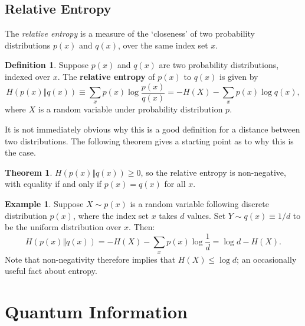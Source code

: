 \documentclass[12pt,a4paper]{report}
\numberwithin{equation}{section}
\theoremstyle{definition}
\newtheorem{definition}{Definition}[section]
\theoremstyle{theorem}
\newtheorem{theorem}{Theorem}[section]
\theoremstyle{theorem}
\theoremstyle{example}
\newtheorem{example}{Example}[section]
\theoremstyle{definition}
\begin{document}
\subsection{Relative Entropy}
The \textit{relative entropy} is a measure of the `closeness' of two probability distributions $p(x)$ and $q(x)$, over the same index set $x$. 
\begin{definition}
	Suppose $p(x)$ and $q(x)$ are two probability distributions, indexed over $x$. The \textbf{relative entropy} of $p(x)$ to $q(x)$ is given by
	\begin{equation}
		H(p(x)\Vert q(x))\equiv\sum_{x}p(x)\log\frac{p(x)}{q(x)}=-H(X)-\sum_{x}p(x)\log{q(x)},
	\end{equation}
	where $X$ is a random variable under probability distribution $p$.
\end{definition}
It is not immediately obvious why this is a good definition for a distance between two distributions. The following theorem gives a starting point as to why this is the case.
\begin{theorem}
	$H(p(x)\Vert q(x))\geq0$, so the relative entropy is non-negative, with equality if and only if $p(x)=q(x)$ for all $x$.
\end{theorem}
\begin{example}
	Suppose $X\sim p(x)$ is a random variable following discrete distribution $p(x)$, where the index set $x$ takes $d$ values. Set $Y\sim q(x)\equiv 1/d$ to be the uniform distribution over $x$. Then:
	\begin{equation}
		H(p(x)\Vert q(x))=-H(X)-\sum_{x}p(x)\log\frac{1}{d}=\log{d}-H(X).
	\end{equation}
	Note that non-negativity therefore implies that $H(X)\leq\log{d}$; an occasionally useful fact about entropy.
\end{example}
\section{Quantum Information}
\end{document}
